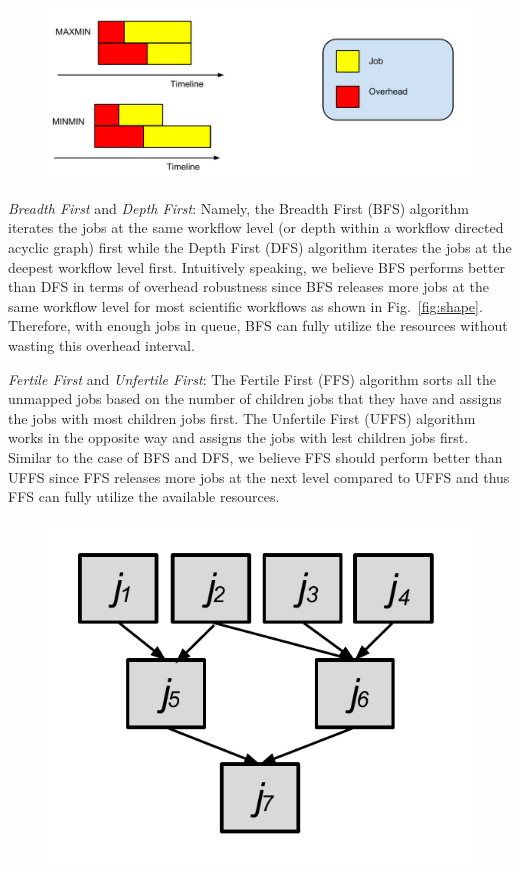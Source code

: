 \documentclass[final,5p,times,twocolumn]{elsarticle}
\begin{document}
\begin{figure}[htb]
\centering
 \includegraphics[width=1.0\linewidth]{figure/longest.pdf}
  \label{fig:longest}
  \vspace{-10pt}
\end{figure}
\emph{Breadth First} and \emph{Depth First}: Namely, the Breadth First (BFS) algorithm iterates the jobs at the same workflow level (or depth within a workflow directed acyclic graph) first while the Depth First (DFS) algorithm iterates the jobs at the deepest workflow level first. Intuitively speaking, we believe BFS performs better than DFS in terms of overhead robustness since BFS releases more jobs at the same workflow level for most scientific workflows as shown in Fig.~\ref{fig:shape}. Therefore, with enough jobs in queue, BFS can fully utilize the resources without wasting this overhead interval.  

\emph{Fertile First} and \emph{Unfertile First}: The Fertile First (FFS) algorithm sorts all the unmapped jobs based on the number of children jobs that they have and assigns the jobs with most children jobs first. The Unfertile First (UFFS) algorithm works in the opposite way and assigns the jobs with lest children jobs first. Similar to the case of BFS and DFS, we believe FFS should perform better than UFFS since FFS releases more jobs at the next level compared to UFFS and thus FFS can fully utilize the available resources. 

\begin{figure}[htb]
\centering
 \includegraphics[width=0.6\linewidth]{figure/impact_factor.pdf}
  \label{fig:impact}
  \vspace{-10pt}
\end{figure}
\end{document}
